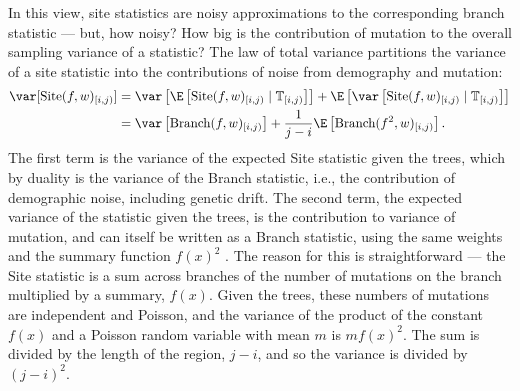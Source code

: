 \documentclass{article}
\newcommand{\branch}{\mbox{Branch}} %
\newcommand{\site}{\mbox{Site}} %
\newcommand{\given}{\;\vert\;}
\newcommand{\treeseq}{\mathbb{T}} %
\newcommand{\iw}{w} %
\begin{document}
In this view,
site statistics are noisy approximations to the corresponding branch statistic
--- but, how noisy?
How big is the contribution of mutation to the overall sampling variance of a statistic?
The law of total variance partitions the variance of a site statistic
into the contributions of noise from demography and mutation:
\begin{align*}
    \var[\site(f, \iw)_{[i,j)}]
    &=
        \var\left[ \E\left[\site(f, \iw)_{[i,j)} \given \treeseq_{[i,j)}\right] \right]
            +
        \E\left[ \var\left[\site(f, \iw)_{[i,j)} \given \treeseq_{[i,j)}\right] \right]
        \\
    &=
        \var\left[ \branch(f, \iw)_{[i,j)} \right]
            +
        \frac{1}{j-i} \E\left[ \branch(f^2, \iw)_{[i,j)} \right] .
\end{align*}
The first term is the variance of the expected Site statistic given the trees,
which by duality is the variance of the Branch statistic,
i.e., the contribution of demographic noise, including genetic drift.
The second term, the expected variance of the statistic given the trees,
is the contribution to variance of mutation,
and can itself be written as a Branch statistic,
using the same weights and the summary function $f(x)^2$
\citep[Lemma 2 in][]{ralph2019empirical}.
The reason for this is straightforward ---
the Site statistic is a sum across branches of the number of mutations on the branch
multiplied by a summary, $f(x)$.
Given the trees, these numbers of mutations are independent and Poisson,
and the variance of the product of the constant $f(x)$
and a Poisson random variable with mean $m$ is $m f(x)^2$.
The sum is divided by the length of the region, $j-i$,
and so the variance is divided by $(j-i)^2$.
\end{document}
